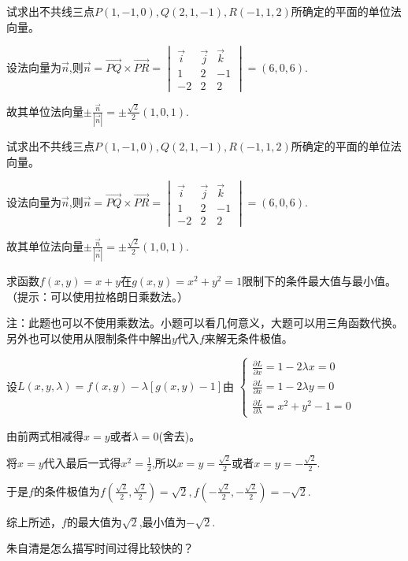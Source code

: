 \documentclass[addtable,twoside,12pt]{hnuexam}
\begin{document}
\begin{questions}
\question[9]
试求出不共线三点$P(1,-1,0),Q(2,1,-1),R(-1,1,2)$所确定的平面的单位法向量。
\begin{solution}
设法向量为$\vec{n}$,则$\vec{n}=\vec{PQ}\times\vec{PR}=
\begin{vmatrix}
	\vec{i} & \vec{j} & \vec{k} \\
	1       & 2       & -1      \\
	-2      & 2       & 2
\end{vmatrix}=(6,0,6).$

故其单位法向量$\pm\frac{\vec{n}}{|\vec{n}|}=\pm\frac{\sqrt{2}}{2}(1,0,1).$
\end{solution}

\question[9]
试求出不共线三点$P(1,-1,0),Q(2,1,-1),R(-1,1,2)$所确定的平面的单位法向量。
\begin{solution}
设法向量为$\vec{n}$,则$\vec{n}=\vec{PQ}\times\vec{PR}=
\begin{vmatrix}
	\vec{i} & \vec{j} & \vec{k} \\
	1       & 2       & -1      \\
	-2      & 2       & 2
\end{vmatrix}=(6,0,6).$
	
故其单位法向量$\pm\frac{\vec{n}}{|\vec{n}|}=\pm\frac{\sqrt{2}}{2}(1,0,1).$
\end{solution}
\clearpage

\question[10]
求函数$f(x,y)=x+y$在$g(x,y)=x^2+y^2=1$限制下的条件最大值与最小值。（提示：可以使用拉格朗日乘数法。）
\begin{solution}
注：此题也可以不使用乘数法。小题可以看几何意义，大题可以用三角函数代换。另外也可以使用从限制条件中解出$y$代入$f$来解无条件极值。

设$L(x,y,\lambda)=f(x,y)-\lambda [g(x,y)-1]$由
$\begin{cases}
	\frac{\partial L}{\partial x}=1-2\lambda x=0 \\
	\frac{\partial L}{\partial x}=1-2\lambda y=0 \\
	\frac{\partial L}{\partial \lambda}=x^2+y^2-1=0
\end{cases}$

由前两式相减得$x=y$或者$\lambda=0$(舍去)。

将$x=y$代入最后一式得$x^2=\frac{1}{2}$,所以$x=y=\frac{\sqrt{2}}{2}$或者$x=y=-\frac{\sqrt{2}}{2}$.

于是$f$的条件极值为$f(\frac{\sqrt{2}}{2},\frac{\sqrt{2}}{2})=\sqrt{2},f(-\frac{\sqrt{2}}{2},-\frac{\sqrt{2}}{2})=-\sqrt{2}.$

综上所述，$f$的最大值为$\sqrt{2}$,最小值为$-\sqrt{2}.$
\end{solution}

\question[13]
朱自清是怎么描写时间过得比较快的？
\end{questions}
\end{document}
